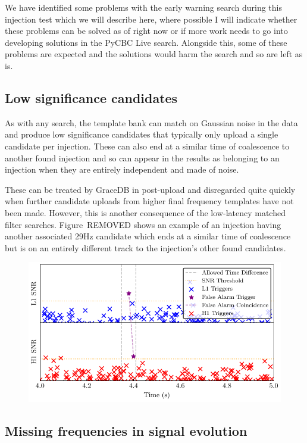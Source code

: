 We have identified some problems with the early warning search during this injection test which we will describe here, where possible I will indicate whether these problems can be solved as of right now or if more work needs to go into developing solutions in the PyCBC Live search. Alongside this, some of these problems are expected and the solutions would harm the search and so are left as is.

\subsection{Low significance candidates}

As with any search, the template bank can match on Gaussian noise in the data and produce low significance candidates that typically only upload a single candidate per injection. These can also end at a similar time of coalescence to another found injection and so can appear in the results as belonging to an injection when they are entirely independent and made of noise.

These can be treated by GraceDB in post-upload and disregarded quite quickly when further candidate uploads from higher final frequency templates have not been made. However, this is another consequence of the low-latency matched filter searches. Figure~REMOVED shows an example of an injection having another associated 29Hz candidate which ends at a similar time of coalescence but is on an entirely different track to the injection's other found candidates.
%
\begin{figure}
       \centering
    \includegraphics[width=\textwidth]{images/6_earlywarning/identified-problems/low_sig_cands.pdf}
    \caption{}
    \label{6:fig:low_significance_candidates}
\end{figure}
%

\subsection{Missing frequencies in signal evolution}

